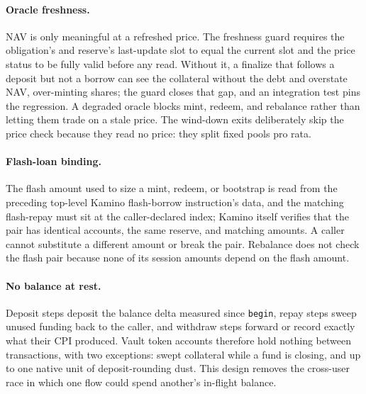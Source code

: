 \documentclass[11pt]{article}
\theoremstyle{remark}
\begin{document}
\paragraph{Oracle freshness.}
NAV is only meaningful at a refreshed price. The freshness guard requires the obligation's and reserve's last-update slot to equal the current slot and the price status to be fully valid before any read. Without it, a finalize that follows a deposit but not a borrow can see the collateral without the debt and overstate NAV, over-minting shares; the guard closes that gap, and an integration test pins the regression. A degraded oracle blocks mint, redeem, and rebalance rather than letting them trade on a stale price. The wind-down exits deliberately skip the price check because they read no price: they split fixed pools pro rata.

\paragraph{Flash-loan binding.}
The flash amount used to size a mint, redeem, or bootstrap is read from the preceding top-level Kamino flash-borrow instruction's data, and the matching flash-repay must sit at the caller-declared index; Kamino itself verifies that the pair has identical accounts, the same reserve, and matching amounts. A caller cannot substitute a different amount or break the pair. Rebalance does not check the flash pair because none of its session amounts depend on the flash amount.

\paragraph{No balance at rest.}
Deposit steps deposit the balance delta measured since \texttt{begin}, repay steps sweep unused funding back to the caller, and withdraw steps forward or record exactly what their CPI produced. Vault token accounts therefore hold nothing between transactions, with two exceptions: swept collateral while a fund is closing, and up to one native unit of deposit-rounding dust. This design removes the cross-user race in which one flow could spend another's in-flight balance.
\end{document}
